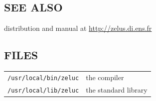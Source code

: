 \documentclass[11pt,titlepage,twoside]{report}
\begin{document}
\subsection*{SEE ALSO}

distribution and manual at \url{http://zelus.di.ens.fr}

\subsection*{FILES}

\begin{tabular}{ll}
{\tt /usr/local/bin/zeluc}           & the compiler
\\
{\tt /usr/local/lib/zeluc} & the standard library
\end{tabular}



\end{document}
